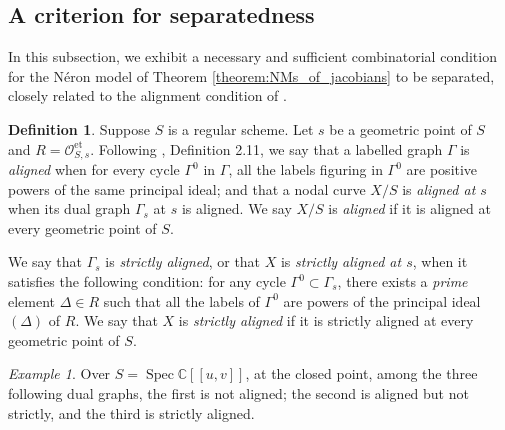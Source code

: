 \documentclass[a4paper,10pt,twoside]{article}
\newcommand{\C}{\mathbb{C}}
\newcommand{\on}[1]{\operatorname{#1}}
\renewcommand{\O}{\mathcal{O}}
\DeclareMathOperator{\spec}{Spec}
\theoremstyle{definition}
\newtheorem{defi}[thm]{Definition}
\theoremstyle{remark}
\newtheorem{ex}[thm]{Example}
\renewcommand{\on}[1]{\operatorname{#1}}
\begin{document}
\subsection{A criterion for separatedness}

In this subsection, we exhibit a necessary and sufficient combinatorial condition for the Néron model of Theorem \ref{theorem:NMs_of_jacobians} to be separated, closely related to the alignment condition of \cite{Holmes}.

\begin{defi}\label{c-strict alignment}
	Suppose $S$ is a regular scheme. Let $s$ be a geometric point of $S$ and $R=\O_{S,s}^{\on{et}}$. Following \cite{Holmes}, Definition 2.11, we say that a labelled graph $\Gamma$ is \textit{aligned} when for every cycle $\Gamma^0$ in $\Gamma$, all the labels figuring in $\Gamma^0$ are positive powers of the same principal ideal; and that a nodal curve $X/S$ is \textit{aligned at $s$} when its dual graph $\Gamma_s$ at $s$ is aligned. We say $X/S$ is \emph{aligned} if it is aligned at every geometric point of $S$.

	We say that $\Gamma_s$ is \textit{strictly aligned}, or that $X$ is \textit{strictly aligned at $s$}, when it satisfies the following condition: for any cycle $\Gamma^0\subset\Gamma_s$, there exists a \emph{prime} element $\Delta\in R$ such that all the labels of $\Gamma^0$ are powers of the principal ideal $(\Delta)$ of $R$. We say that $X$ is \textit{strictly aligned} if it is strictly aligned at every geometric point of $S$.
\end{defi}

\begin{ex}
Over $S=\spec\C[[u,v]]$, at the closed point, among the three following dual graphs, the first is not aligned; the second is aligned but not strictly, and the third is strictly aligned.

\begin{center}
\end{center}


\begin{center}
\end{center}

\begin{center}
\end{center}
\end{ex}
\end{document}
